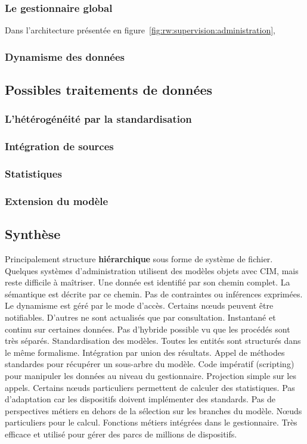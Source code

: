 \subsubsection{Le gestionnaire global}
Dans l'architecture présentée en figure~\ref{fig:rw:supervision:administration}, 
\subsubsection{Dynamisme des données}
\subsection{Possibles traitements de données}
\subsubsection{L'hétérogénéité par la standardisation}
\subsubsection{Intégration de sources}
\subsubsection{Statistiques}
\subsubsection{Extension du modèle}
\subsection{Synthèse}

\begin{table}[ht]
\criteretabDonnee
    {Principalement structure \textbf{hiérarchique} sous forme de système de fichier. Quelques systèmes d'administration utilisent des modèles objets avec CIM, mais reste difficile à maîtriser.}
    {Une donnée est identifié par son chemin complet. La sémantique est décrite par ce chemin. Pas de contraintes ou inférences exprimées.}
    {Le dynamisme est géré par le mode d'accès. Certains nœuds peuvent être notifiables. D'autres ne sont actualisés que par consultation.}
\criteretabTraitement
    {Instantané et continu sur certaines données. Pas d'hybride possible vu que les procédés sont très séparés.}
    {Standardisation des modèles. Toutes les entités sont structurés dans le même formalisme. Intégration par union des résultats.}
    {Appel de méthodes standardes pour récupérer un sous-arbre du modèle. Code impératif (scripting) pour manipuler les données au niveau du gestionnaire.}
    {Projection simple sur les appels. Certains nœuds particuliers permettent de calculer des statistiques.}
\criteretabAdaptabilite
    {Pas d'adaptation car les dispositifs doivent implémenter des standards.}
    {Pas de perspectives métiers en dehors de la sélection sur les branches du modèle.}
    {Nœuds particuliers pour le calcul. Fonctions métiers intégrées dans le gestionnaire.}
    {Très efficace et utilisé pour gérer des parcs de millions de dispositifs.}
\end{table}